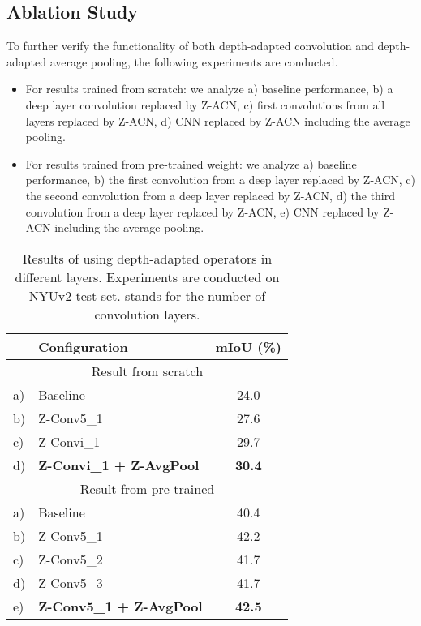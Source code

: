 \documentclass[lettersize,journal]{IEEEtran}
\begin{document}
\subsection{Ablation Study} 

To further verify the functionality of both depth-adapted convolution and depth-adapted average pooling, the following experiments are conducted. 
\begin{itemize}
    \item For results trained from scratch: we analyze a) baseline performance, b) a deep layer convolution replaced by Z-ACN, c) first convolutions from all layers replaced by Z-ACN, d) CNN replaced by Z-ACN including the average pooling.
    \item For results trained from pre-trained weight: we analyze a) baseline performance, b) the first convolution from a deep layer replaced by Z-ACN, c) the second convolution from a deep layer replaced by Z-ACN, d) the third convolution from a deep layer replaced by Z-ACN, e) CNN replaced by Z-ACN including the average pooling.
\end{itemize}

\begin{table}[t]
\centering
\setlength\tabcolsep{10pt}
\setlength\extrarowheight{0pt}
\caption{Results of using depth-adapted operators in different layers. Experiments are conducted on NYUv2 test set.  stands for the number of convolution layers.}
\begin{tabular}[ht]{ l |l |c } 
\hline

\hline
 & Configuration & mIoU (\%)  \\
\hline
\multicolumn{3}{c}{Result from scratch} \\
\hline
a) & Baseline & 24.0  \\ 
\hline
b) & Z-Conv5\_1 & 27.6  \\ 
\hline
c) & Z-Convi\_1 & 29.7  \\ 
\hline
d) & \textbf{Z-Convi\_1 + Z-AvgPool} & \textbf{30.4}  \\ 
\hline
\multicolumn{3}{c}{Result from pre-trained} \\
\hline
a) & Baseline & 40.4  \\
\hline
b) & Z-Conv5\_1 & 42.2 \\
\hline
c) & Z-Conv5\_2 & 41.7 \\
\hline
d) & Z-Conv5\_3 & 41.7 \\
\hline
e) & \textbf{Z-Conv5\_1 + Z-AvgPool} & \textbf{42.5} \\
\hline

\hline
\end{tabular}

\label{ablation}
\end{table}
\end{document}
